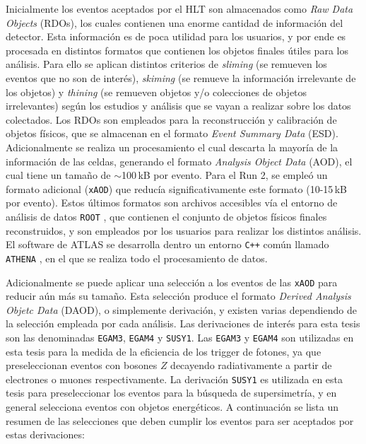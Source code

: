Inicialmente los eventos aceptados por el HLT son almacenados como \textit{Raw Data Objects} (RDOs), los cuales contienen una enorme cantidad de información del detector. Esta información es de poca utilidad para los usuarios, y por ende es procesada en distintos formatos que contienen los objetos finales útiles para los análisis. Para ello se aplican distintos criterios de \textit{sliming} (se remueven los eventos que no son de interés), \textit{skiming} (se remueve la información irrelevante de los objetos) y \textit{thining} (se remueven objetos y/o colecciones de objetos irrelevantes) según los estudios y análisis que se vayan a realizar sobre los datos colectados. Los RDOs son empleados para la reconstrucción y calibración de objetos físicos, que se almacenan en el formato \textit{Event Summary Data} (ESD). Adicionalmente se realiza un procesamiento el cual descarta la mayoría de la información de las celdas, generando el formato \textit{Analysis Object Data} (AOD), el cual tiene un tamaño de $\sim$100\,kB por evento. Para el Run 2, se empleó un formato adicional (\texttt{xAOD}) que reducía significativamente este formato (10-15\,kB por evento). Estos últimos formatos son archivos accesibles vía el entorno de análisis de datos \texttt{ROOT} \cite{root}, que contienen el conjunto de  objetos físicos finales reconstruidos, y son empleados por los usuarios para realizar los distintos análisis.
El software de ATLAS se desarrolla dentro un entorno \texttt{C++} común llamado \texttt{ATHENA} \cite{ATLAS-TDR-17, analysistools, athena}, en el que se realiza todo el procesamiento de datos. 

Adicionalmente se puede aplicar una selección a los eventos de las \texttt{xAOD} para reducir aún más su tamaño. Esta selección produce el formato \textit{Derived Analysis Objetc Data} (DAOD), o simplemente derivación, y existen varias dependiendo de la selección empleada por cada análisis. Las derivaciones de interés para esta tesis son las denominadas \texttt{EGAM3}, \texttt{EGAM4} y \texttt{SUSY1}. Las \texttt{EGAM3} y \texttt{EGAM4} son utilizadas en esta tesis para la medida de la eficiencia de los trigger de fotones, ya que preseleccionan eventos con bosones $Z$ decayendo radiativamente a partir de electrones o muones respectivamente. La derivación \texttt{SUSY1} es utilizada en esta tesis para preseleccionar los eventos para la búsqueda de supersimetría, y en general selecciona eventos con objetos energéticos. A continuación se lista un resumen de las selecciones que deben cumplir los eventos para ser aceptados por estas derivaciones:


